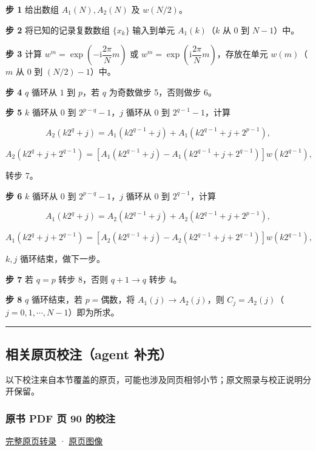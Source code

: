 \documentclass[
  10pt,
  fontset=fandol]{ctexart}
\begin{document}
\textbf{步 1} 给出数组 \(A_1(N),A_2(N)\) 及 \(w(N/2)\)。

\textbf{步 2} 将已知的记录复数数组 \(\{x_k\}\) 输入到单元 \(A_1(k)\)（\(k\) 从 \(0\) 到 \(N-1\)）中。

\textbf{步 3} 计算 \(w^m=\exp\left(-\mathrm i\dfrac{2\pi}{N}m\right)\) 或 \(w^m=\exp\left(\mathrm i\dfrac{2\pi}{N}m\right)\)，存放在单元 \(w(m)\)（\(m\) 从 \(0\) 到 \((N/2)-1\)）中。

\textbf{步 4} \(q\) 循环从 \(1\) 到 \(p\)，若 \(q\) 为奇数做步 5，否则做步 6。

\textbf{步 5} \(k\) 循环从 \(0\) 到 \(2^{p-q}-1\)，\(j\) 循环从 \(0\) 到 \(2^{q-1}-1\)，计算

\[
A_2(k2^q+j)=A_1(k2^{q-1}+j)+A_1(k2^{q-1}+j+2^{p-1}),
\]

\[
A_2(k2^q+j+2^{q-1})=[A_1(k2^{q-1}+j)-A_1(k2^{q-1}+j+2^{q-1})]w(k2^{q-1}),
\]

转步 7。

\textbf{步 6} \(k\) 循环从 \(0\) 到 \(2^{p-q}-1\)，\(j\) 循环从 \(0\) 到 \(2^{q-1}\)，计算

\[
A_1(k2^q+j)=A_2(k2^{q-1}+j)+A_2(k2^{q-1}+j+2^{p-1}),
\]

\[
A_1(k2^q+j+2^{q-1})=[A_2(k2^{q-1}+j)-A_2(k2^{q-1}+j+2^{q-1})]w(k2^{q-1}),
\]

\(k,j\) 循环结束，做下一步。

\textbf{步 7} 若 \(q=p\) 转步 8，否则 \(q+1\to q\) 转步 4。

\textbf{步 8} \(q\) 循环结束，若 \(p=\text{偶数}\)，将 \(A_1(j)\to A_2(j)\)，则 \(C_j=A_2(j)\)（\(j=0,1,\cdots,N-1\)）即为所求。

\begin{center}\rule{0.5\linewidth}{0.5pt}\end{center}

\subsection{相关原页校注（agent 补充）}\label{ux76f8ux5173ux539fux9875ux6821ux6ce8agent-ux8865ux5145}

以下校注来自本节覆盖的原页，可能也涉及同页相邻小节；原文照录与校正说明分开保留。

\subsubsection{原书 PDF 页 90 的校注}\label{ux539fux4e66-pdf-ux9875-90-ux7684ux6821ux6ce8}

\href{../pages/pdf-090.md}{完整原页转录} · \href{../../source-images/pdf-090.jpeg}{原页图像}
\end{document}
